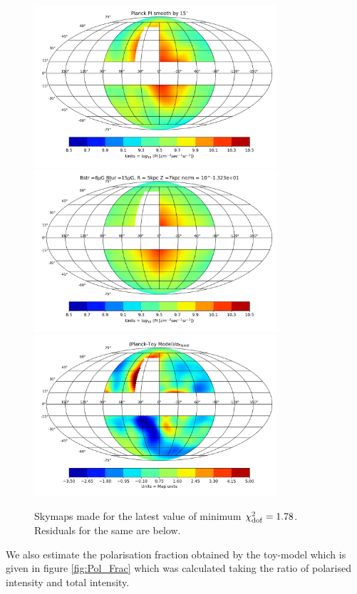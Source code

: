 \documentclass[12pt, a4 paper]{article}
\begin{document}
\begin{figure}[h!]
        \centering
        \includegraphics[width =9cm]{Images/Jan-08-2022_Planck_Sky_Map.png}%
        \includegraphics[width=9cm]{Images/Jan-08-2022_Skymap_Bstr_8_Btur_15_Rmag_5_Zmag_7_norm_-1.32e+01.png}
        \includegraphics[width = 9cm]{Images/Jan-08-2022_Residue_Bstr_5_Btur_14_Rmag_5_Zmag_7_norm_-1.29e+01.png}
    \caption{Skymaps made for the latest value of minimum $\chi^2_{\rm dof} = 1.78$. Residuals for the same are below.}
    \label{fig:Skymaps}
\end{figure}
We also estimate the polarisation fraction obtained by the toy-model which is given in figure \ref{fig:Pol_Frac} which was calculated taking the ratio of polarised intensity and total intensity. 
\end{document}
